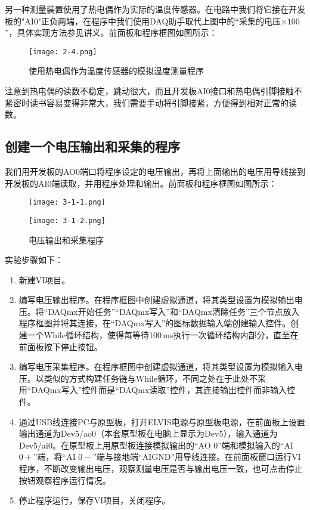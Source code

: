 \documentclass[12pt]{article}
\begin{document}
另一种测量装置使用了热电偶作为实际的温度传感器。在电路中我们将它接在开发板的"AI0"正负两端，在程序中我们使用DAQ助手取代上图中的“采集的电压$\times100$”，具体实现方法参见讲义。前面板和程序框图如图所示：

\begin{figure}[h!]
    \centering
    \texttt{[image: 2-4.png]}
    \caption{使用热电偶作为温度传感器的模拟温度测量程序}
\end{figure}

注意到热电偶的读数不稳定，跳动很大，而且开发板AI0接口和热电偶引脚接触不紧密时读书容易变得非常大，我们需要手动将引脚接紧，方便得到相对正常的读数。

\subsection{创建一个电压输出和采集的程序}
我们用开发板的AO0端口将程序设定的电压输出，再将上面输出的电压用导线接到开发板的AI0端读取，并用程序处理和输出。前面板和程序框图如图所示：

\begin{figure}[h!]
    \centering
    \texttt{[image: 3-1-1.png]}
\end{figure}

\begin{figure}[h!]
    \centering
    \texttt{[image: 3-1-2.png]}
    \caption{电压输出和采集程序}
\end{figure}

实验步骤如下：

\begin{enumerate}
    \item 新建VI项目。
    \item 编写电压输出程序。在程序框图中创建虚拟通道，将其类型设置为模拟输出电压。将“DAQmx开始任务”“DAQmx写入”和“DAQmx清除任务”三个节点放入程序框图并将其连接，在“DAQmx写入”的图标数据输入端创建输入控件。创建一个While循环结构，使得每等待100\,ms执行一次循环结构内部分，直至在前面板按下停止按钮。
    \item 编写电压采集程序。在程序框图中创建虚拟通道，将其类型设置为模拟输入电压。以类似的方式构建任务链与While循环，不同之处在于此处不采用“DAQmx写入”控件而是“DAQmx读取”控件，其连接输出控件而非输入控件。
    \item 通过USB线连接PC与原型板，打开ELVIS电源与原型板电源，在前面板上设置输出通道为Dev5/ao0（本套原型板在电脑上显示为Dev5），输入通道为Dev5/ai0。在原型板上用原型板连接模拟输出的“AO 0”端和模拟输入的“AI $ 0+ $”端，将“AI $ 0- $”端与接地端“AIGND”用导线连接。在前面板窗口运行VI程序，不断改变输出电压，观察测量电压是否与输出电压一致，也可点击停止按钮观察程序运行情况。
    \item 停止程序运行，保存VI项目，关闭程序。
\end{enumerate}
\end{document}
